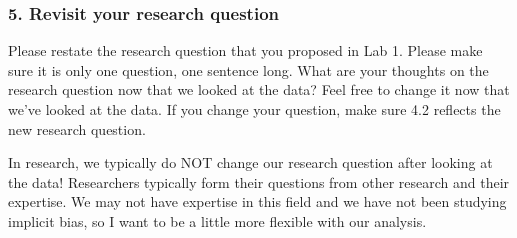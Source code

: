 \documentclass[
  letterpaper,
  DIV=11,
  numbers=noendperiod]{scrartcl}
\begin{document}
\hypertarget{revisit-your-research-question}{%
\subsubsection{5. Revisit your research
question}\label{revisit-your-research-question}}

\begin{tcolorbox}[enhanced jigsaw, left=2mm, opacitybacktitle=0.6, arc=.35mm, colback=white, colframe=quarto-callout-important-color-frame, bottomrule=.15mm, opacityback=0, toptitle=1mm, toprule=.15mm, titlerule=0mm, colbacktitle=quarto-callout-important-color!10!white, rightrule=.15mm, leftrule=.75mm, title=\textcolor{quarto-callout-important-color}{\faExclamation}\hspace{0.5em}{Task}, breakable, bottomtitle=1mm, coltitle=black]

Please restate the research question that you proposed in Lab 1. Please
make sure it is only one question, one sentence long. What are your
thoughts on the research question now that we looked at the data? Feel
free to change it now that we've looked at the data. If you change your
question, make sure 4.2 reflects the new research question.

\end{tcolorbox}

\begin{tcolorbox}[enhanced jigsaw, left=2mm, opacitybacktitle=0.6, arc=.35mm, colback=white, colframe=quarto-callout-note-color-frame, bottomrule=.15mm, opacityback=0, toptitle=1mm, toprule=.15mm, titlerule=0mm, colbacktitle=quarto-callout-note-color!10!white, rightrule=.15mm, leftrule=.75mm, title=\textcolor{quarto-callout-note-color}{\faInfo}\hspace{0.5em}{Note}, breakable, bottomtitle=1mm, coltitle=black]

In research, we typically do NOT change our research question after
looking at the data! Researchers typically form their questions from
other research and their expertise. We may not have expertise in this
field and we have not been studying implicit bias, so I want to be a
little more flexible with our analysis.

\end{tcolorbox}
\end{document}
